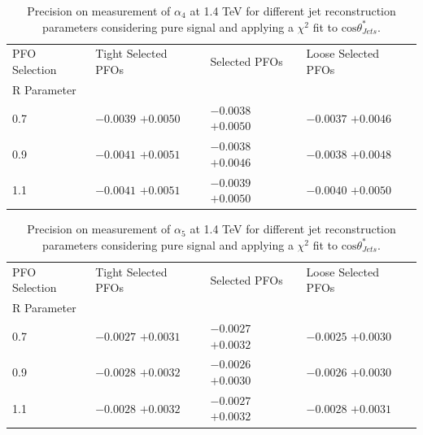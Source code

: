 \begin{table}[h!]
\centering
\begin{tabular}{l l l l}
\hline
PFO Selection & Tight Selected PFOs & Selected PFOs & Loose Selected PFOs \\ 
R Parameter & & & \\ 
\hline
0.7 & $-0.0039$ $+0.0050$ & $-0.0038$ $+0.0050$ & $-0.0037$ $+0.0046$ \\
0.9 & $-0.0041$ $+0.0051$ & $-0.0038$ $+0.0046$ & $-0.0038$ $+0.0048$ \\
1.1 & $-0.0041$ $+0.0051$ & $-0.0039$ $+0.0050$ & $-0.0040$ $+0.0050$ \\
\hline
\end{tabular}
\caption[$1\sigma$ precision on measurement of $\alpha_{4}$ for different jet reconstruction parameters considering pure signal at 1.4 TeV.]{Precision on measurement of $\alpha_{4}$ at 1.4 TeV for different jet reconstruction parameters considering pure signal and applying a $\chi^{2}$ fit to $\text{cos}\theta^{*}_{Jets}$.}
\label{table:precisiona4signaljetalgo1400GeV}
\end{table}

\begin{table}[h!]
\centering
\begin{tabular}{l l l l}
\hline
PFO Selection & Tight Selected PFOs & Selected PFOs & Loose Selected PFOs \\ 
R Parameter & & & \\ 
\hline
0.7 & $-0.0027$ $+0.0031$ & $-0.0027$ $+0.0032$ & $-0.0025$ $+0.0030$ \\
0.9 & $-0.0028$ $+0.0032$ & $-0.0026$ $+0.0030$ & $-0.0026$ $+0.0030$ \\
1.1 & $-0.0028$ $+0.0032$ & $-0.0027$ $+0.0032$ & $-0.0028$ $+0.0031$ \\
\hline
\end{tabular}
\caption[$1\sigma$ precision on measurement of $\alpha_{5}$ for different jet reconstruction parameters considering pure signal at 1.4 TeV.]{Precision on measurement of $\alpha_{5}$ at 1.4 TeV for different jet reconstruction parameters considering pure signal and applying a $\chi^{2}$ fit to $\text{cos}\theta^{*}_{Jets}$.}
\label{table:precisiona5signaljetalgo1400GeV}
\end{table}

